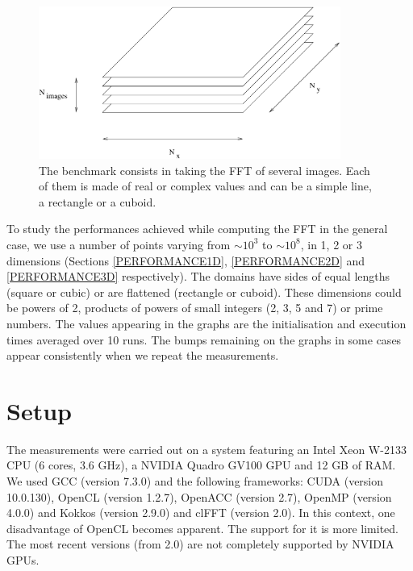 \documentclass[12pt, a4paper]{article}
\begin{document}
\begin{figure}[H]
\captionsetup{width=0.6\textwidth}
\centering
\includegraphics[height=5cm]{benchmark.pdf}
\caption{The benchmark consists in taking the FFT of several images. Each of them is made of real or complex values and can be a simple line, a rectangle or a cuboid.}
\label{benchmark}
\end{figure}

To study the performances achieved while computing the FFT in the general case, we use a number of points varying from $\sim 10^3$ to $\sim 10^8$, in 1, 2 or 3 dimensions (Sections \ref{PERFORMANCE1D}, \ref{PERFORMANCE2D} and \ref{PERFORMANCE3D} respectively). The domains have sides of equal lengths (square or cubic) or are flattened (rectangle or cuboid). These dimensions could be powers of 2, products of powers of small integers (2, 3, 5 and 7) or prime numbers. The values appearing in the graphs are the initialisation and execution times averaged over 10 runs. The bumps remaining on the graphs in some cases appear consistently when we repeat the measurements.

\section{Setup}

The measurements were carried out on a system featuring an Intel Xeon W-2133 CPU (6 cores, 3.6 GHz), a NVIDIA Quadro GV100 GPU and 12 GB of RAM. We used GCC (version 7.3.0) and the following frameworks: CUDA (version 10.0.130), OpenCL (version 1.2.7), OpenACC (version 2.7), OpenMP (version 4.0.0) and Kokkos (version 2.9.0) and clFFT (version 2.0). In this context, one disadvantage of OpenCL becomes apparent. The support for it is more limited. The most recent versions (from 2.0) are not completely supported by NVIDIA GPUs.  
\end{document}
